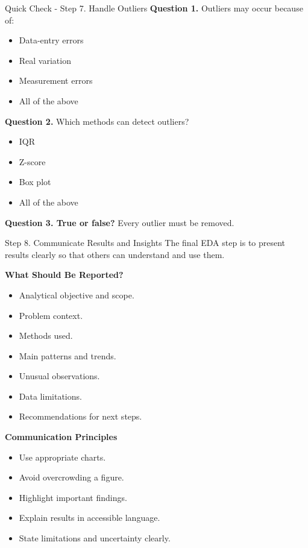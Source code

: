 \documentclass[aspectratio=169,11pt]{beamer}
\begin{document}
\begin{frame}[allowframebreaks]{Quick Check - Step 7. Handle Outliers}
\footnotesize
\textbf{Question 1.} Outliers may occur because of:\par\medskip
\begin{itemize}
\item[\textbf{A.}] Data-entry errors
\item[\textbf{B.}] Real variation
\item[\textbf{C.}] Measurement errors
\item[\textbf{D.}] All of the above
\end{itemize}
\textbf{Question 2.} Which methods can detect outliers?\par\medskip
\begin{itemize}
\item[\textbf{A.}] IQR
\item[\textbf{B.}] Z-score
\item[\textbf{C.}] Box plot
\item[\textbf{D.}] All of the above
\end{itemize}
\textbf{Question 3. True or false?} Every outlier must be removed.\par\medskip
\end{frame}
\begin{frame}[allowframebreaks]{Step 8. Communicate Results and Insights}
\small
The final EDA step is to present results clearly so that others can understand and use them.\par\medskip
\textbf{What Should Be Reported?}\par\medskip
\begin{itemize}
\item Analytical objective and scope.
\item Problem context.
\item Methods used.
\item Main patterns and trends.
\item Unusual observations.
\item Data limitations.
\item Recommendations for next steps.
\end{itemize}
\textbf{Communication Principles}\par\medskip
\begin{itemize}
\item Use appropriate charts.
\item Avoid overcrowding a figure.
\item Highlight important findings.
\item Explain results in accessible language.
\item State limitations and uncertainty clearly.
\end{itemize}
\end{frame}
\end{document}
